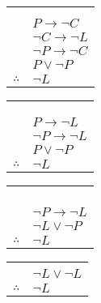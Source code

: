 \documentclass{article}
\begin{document}
\begin{tabular}{c@{\,}l@{}} 
                         &\\ &\\ & $P \rightarrow \neg C$ \\
                         & $\neg C \rightarrow \neg L$ \\
                         & $\neg P \rightarrow \neg C$ \\
\arrayrulecolor{blue}    & $P \vee \neg P$ \\
\cline{2-2}
    $\therefore$         & $\neg L$ \\
\end{tabular}
\begin{tabular}{c@{\,}l@{}} 
                         &\\ &\\ &\\ & $P \rightarrow \neg L$ \\
                         & $\neg P \rightarrow \neg L$ \\
\arrayrulecolor{blue}    & $P \vee \neg P$ \\
\cline{2-2}
    $\therefore$         & $\neg L$ \\
\end{tabular}
\begin{tabular}{c@{\,}l@{}} 
                         
                         &\\ &\\ &\\ & \\
                         & $\neg P \rightarrow \neg L$ \\
\arrayrulecolor{blue}    & $\neg L \vee \neg P$ \\
\cline{2-2}
    $\therefore$         & $\neg L$ \\
\end{tabular}
\newline
\begin{tabular}{c@{\,}l@{}}&\\
\arrayrulecolor{blue}    & $\neg L \vee \neg L$ \\
\cline{2-2}
    $\therefore$         & $\neg L$ \\
\end{tabular}
\end{document}
